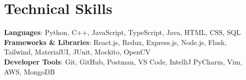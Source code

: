 \section{Technical Skills}
\begin{itemize}[leftmargin=0.15in, label={}]
    \small{\item{
        \textbf{Languages}{: Python, C++, JavaScript, TypeScript, Java, HTML, CSS, SQL} \\
     
        \textbf{Frameworks \& Libraries}{: React.js, Redux, Express.js, Node.js, Flask, Tailwind, MaterialUI, JUnit, Mockito, OpenCV} \\

        \textbf{Developer Tools}{: Git, GitHub, Postman, VS Code, IntelliJ PyCharm, Vim, AWS, MongoDB} \\
    }}
\end{itemize}
